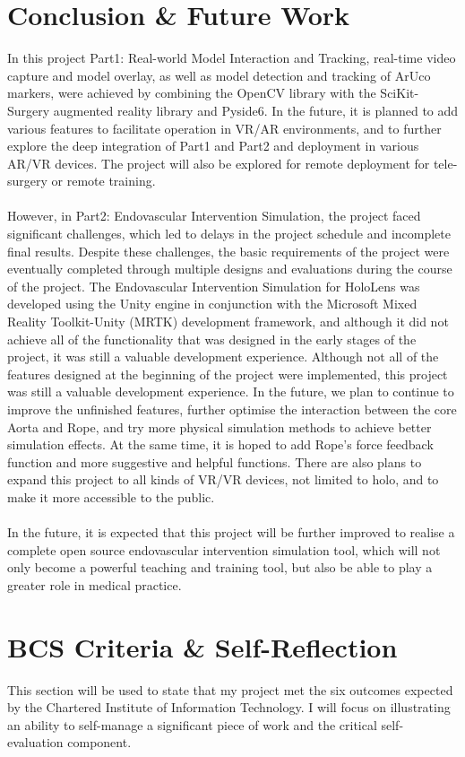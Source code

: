 \documentclass[12pt]{article}
\begin{document}
\section{Conclusion \& Future Work}
In this project Part1: Real-world Model Interaction and Tracking, real-time video capture and model overlay, as well as model detection and tracking of ArUco markers, were achieved by combining the OpenCV library with the SciKit-Surgery augmented reality library and Pyside6. In the future, it is planned to add various features to facilitate operation in VR/AR environments, and to further explore the deep integration of Part1 and Part2 and deployment in various AR/VR devices. The project will also be explored for remote deployment for tele-surgery or remote training.
\\\\
However, in Part2: Endovascular Intervention Simulation, the project faced significant challenges, which led to delays in the project schedule and incomplete final results. Despite these challenges, the basic requirements of the project were eventually completed through multiple designs and evaluations during the course of the project. The Endovascular Intervention Simulation for HoloLens was developed using the Unity engine in conjunction with the Microsoft Mixed Reality Toolkit-Unity (MRTK) development framework, and although it did not achieve all of the functionality that was designed in the early stages of the project, it was still a valuable development experience. Although not all of the features designed at the beginning of the project were implemented, this project was still a valuable development experience. In the future, we plan to continue to improve the unfinished features, further optimise the interaction between the core Aorta and Rope, and try more physical simulation methods to achieve better simulation effects. At the same time, it is hoped to add Rope's force feedback function and more suggestive and helpful functions. There are also plans to expand this project to all kinds of VR/VR devices, not limited to \gls{holo}, and to make it more accessible to the public.
\\\\
In the future, it is expected that this project will be further improved to realise a complete open source endovascular intervention simulation tool, which will not only become a powerful teaching and training tool, but also be able to play a greater role in medical practice.

\section{BCS Criteria \& Self-Reflection}
This section will be used to state that my project met the six outcomes expected by the Chartered Institute of Information Technology\cite{BCS2020}.
I will focus on illustrating an ability to self-manage a significant piece of work and the critical self-evaluation component.
\end{document}
